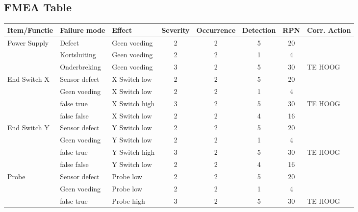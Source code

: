 \newpage
\begin{landscape}
    \subsection{FMEA Table} 
    \begin{longtable}{|l|l|l|c|c|c|c|l|}
        \hline
        \textbf{Item/Functie} & \textbf{Failure mode} & \textbf{Effect} & \textbf{Severity} & \textbf{Occurrence} & \textbf{Detection} & \textbf{RPN} & \textbf{Corr. Action} \\ \hline
        \multirow{3}{*}{Power Supply}       & Defect            & Geen voeding  & 2 & 2 & 5 & 20 & \\
                                            & Kortsluiting      & Geen voeding  & 2 & 2 & 1 &  4 & \\
                                            & Onderbreking      & Geen voeding  & 3 & 2 & 5 & 30 & TE HOOG \\
                                            \hline
        \multirow{4}{*}{End Switch X}       & Sensor defect     & X Switch low  & 2 & 2 & 5 & 20 & \\
                                            & Geen voeding      & X Switch low  & 2 & 2 & 1 &  4 & \\
                                            & false true        & X Switch high & 3 & 2 & 5 & 30 & TE HOOG \\
                                            & false false       & X Switch low  & 2 & 2 & 4 & 16 & \\ 
                                            \hline
        \multirow{4}{*}{End Switch Y}       & Sensor defect     & Y Switch low  & 2 & 2 & 5 & 20 & \\
                                            & Geen voeding      & Y Switch low  & 2 & 2 & 1 &  4 & \\
                                            & false true        & Y Switch high & 3 & 2 & 5 & 30 & TE HOOG \\
                                            & false false       & Y Switch low  & 2 & 2 & 4 & 16 & \\ 
                                            \hline
        \multirow{4}{*}{Probe}              & Sensor defect     & Probe low  & 2 & 2 & 5 & 20 & \\
                                            & Geen voeding      & Probe low  & 2 & 2 & 1 &  4 & \\
                                            & false true        & Probe high & 3 & 2 & 5 & 30 & TE HOOG \\

\end{longtable}
\end{landscape}
